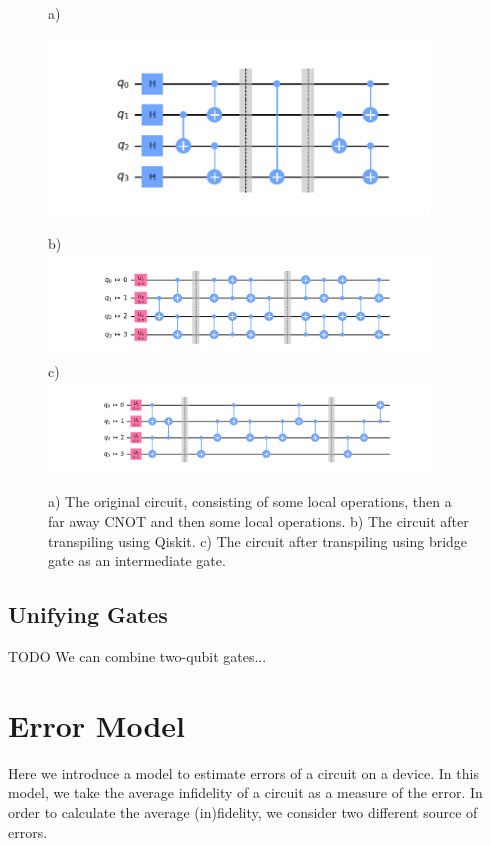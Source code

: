 \documentclass{article}
\begin{document}
  \begin{figure}
    a) \\
    \begin{center}
    \includegraphics[width=0.9\textwidth]{../code/expm_1_bridge/out/original_circuit}
    \end{center}
    b) \\
    \includegraphics[width=0.9\textwidth]{../code/expm_1_bridge/out/transpiled_circuit_swap} \\
    c) \\
    \includegraphics[width=0.9\textwidth]{../code/expm_1_bridge/out/transpiled_circuit_bridge}
    \caption{a) The original circuit, consisting of some local operations, then a far away CNOT and then some local operations. b) The circuit after transpiling using Qiskit. c) The circuit after transpiling using bridge gate as an intermediate gate.}
  \end{figure}
  \subsection{Unifying Gates}

  { \color{blue} TODO }
  We can combine two-qubit gates...

  \section{Error Model}
  \label{sec:error-model}
  Here we introduce a model to estimate errors of a circuit on a device.
  In this model, we take the average infidelity of a circuit as a measure of the error. In order to calculate the average (in)fidelity, we consider two different source of errors.
\end{document}
